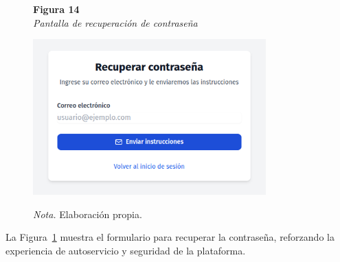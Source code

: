  \begin{figure}[htbp]
    \begin{flushleft}
        \textbf{Figura 14}\\[2em]
        \textit{Pantalla de recuperación de contraseña}
    \end{flushleft}
    \vspace{1em}
    \centering
    \includegraphics[width=0.8\textwidth]{Images/UI2.png}
    \vspace{2em}
    \begin{flushleft}
        \textit{Nota.} Elaboración propia.
    \end{flushleft}
    \label{fig:recuperar_password}
\end{figure}
La Figura~\ref{fig:recuperar_password} muestra el formulario para recuperar la contraseña, reforzando la experiencia de autoservicio y seguridad de la plataforma.
